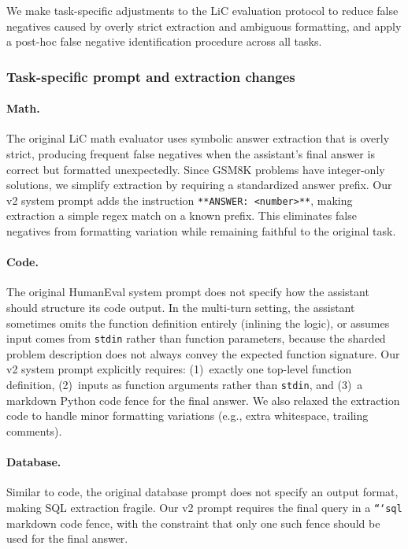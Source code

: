 \documentclass{article}
\begin{document}
We make task-specific adjustments to the LiC evaluation protocol to reduce false negatives caused by overly strict extraction and ambiguous formatting, and apply a post-hoc false negative identification procedure across all tasks.

\subsubsection{Task-specific prompt and extraction changes}
\label{app:eval-adjustments}

\paragraph{Math.} The original LiC math evaluator uses symbolic answer extraction that is overly strict, producing frequent false negatives when the assistant's final answer is correct but formatted unexpectedly. Since GSM8K problems have integer-only solutions, we simplify extraction by requiring a standardized answer prefix. Our v2 system prompt adds the instruction \texttt{**ANSWER: <number>**}, making extraction a simple regex match on a known prefix. This eliminates false negatives from formatting variation while remaining faithful to the original task.

\paragraph{Code.} The original HumanEval system prompt does not specify how the assistant should structure its code output. In the multi-turn setting, the assistant sometimes omits the function definition entirely (inlining the logic), or assumes input comes from \texttt{stdin} rather than function parameters, because the sharded problem description does not always convey the expected function signature. Our v2 system prompt explicitly requires: (1)~exactly one top-level function definition, (2)~inputs as function arguments rather than \texttt{stdin}, and (3)~a markdown Python code fence for the final answer. We also relaxed the extraction code to handle minor formatting variations (e.g., extra whitespace, trailing comments).

\paragraph{Database.} Similar to code, the original database prompt does not specify an output format, making SQL extraction fragile. Our v2 prompt requires the final query in a \texttt{```sql} markdown code fence, with the constraint that only one such fence should be used for the final answer.
\end{document}

